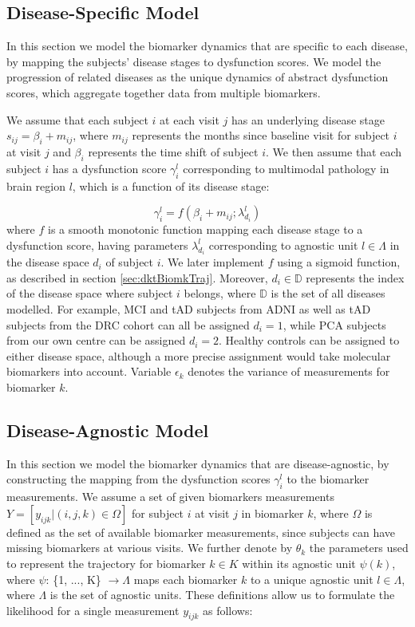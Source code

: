 \documentclass{llncs}
\begin{document}
\subsection{Disease-Specific Model}

In this section we model the biomarker dynamics that are specific to each disease, by mapping the subjects' disease stages to dysfunction scores. We model the progression of related diseases as the unique dynamics of abstract dysfunction scores, which aggregate together data from multiple biomarkers. 

We assume that each subject $i$ at each visit $j$ has an underlying disease stage $s_{ij} = \beta_i + m_{ij}$, where $m_{ij}$ represents the months since baseline visit for subject $i$ at visit $j$ and $\beta_i$ represents the time shift of subject $i$. We then assume that each subject $i$ has a dysfunction score $\gamma_i^l$ corresponding to multimodal pathology in brain region $l$, which is a function of its disease stage:

\begin{equation}
\label{eqDysfunctionScoreDef}
 \gamma_i^l = f(\beta_i + m_{ij}; \lambda_{d_i}^l)
\end{equation}
where $f$ is a smooth monotonic function mapping each disease stage to a dysfunction score, having parameters $\lambda_{d_i}^l$ corresponding to agnostic unit $l \in \Lambda$ in the disease space $d_i$ of subject $i$. We later implement $f$ using a sigmoid function, as described in section \ref{sec:dktBiomkTraj}. Moreover, $d_i \in \mathbb{D}$ represents the index of the disease space where subject $i$ belongs, where $\mathbb{D}$ is the set of all diseases modelled. For example, MCI and tAD subjects from ADNI as well as tAD subjects from the DRC cohort can all be assigned $d_i=1$, while PCA subjects from our own centre can be assigned $d_i=2$. Healthy controls can be assigned to either disease space, although a more precise assignment would take molecular biomarkers into account. Variable $\epsilon_k$ denotes the variance of measurements for biomarker $k$. 

\subsection{Disease-Agnostic Model}

In this section we model the biomarker dynamics that are disease-agnostic, by constructing the mapping from the dysfunction scores $\gamma_i^l$ to the biomarker measurements. We assume a set of given biomarkers measurements $Y = [y_{ijk} | (i,j,k) \in \Omega]$ for subject $i$ at visit $j$ in biomarker $k$, where $\Omega$ is defined as the set of available biomarker measurements, since subjects can have missing biomarkers at various visits. We further denote by $\theta_k$ the parameters used to represent the trajectory for biomarker $k \in K$ within its agnostic unit $\psi(k)$, where $\psi$: \{1, ..., K\} $ \rightarrow \Lambda$ maps each biomarker $k$ to a unique agnostic unit $l \in \Lambda$, where $\Lambda$ is the set of agnostic units. These definitions allow us to formulate the likelihood for a single measurement $y_{ijk}$ as follows:
\end{document}
